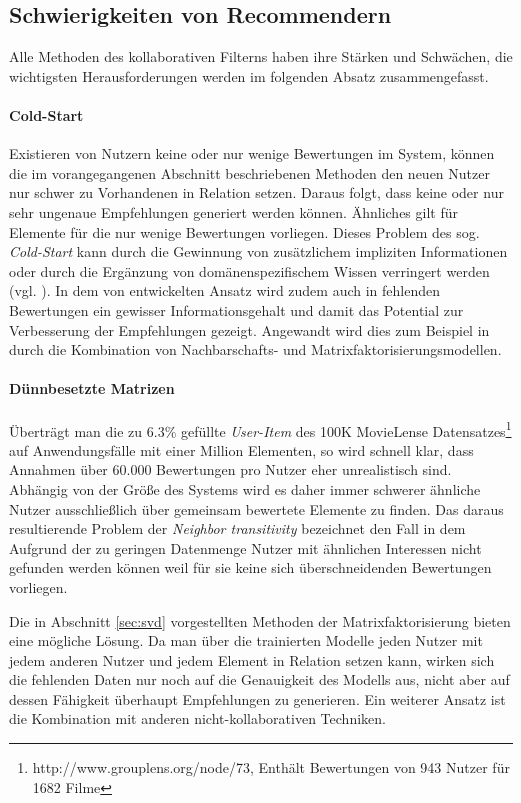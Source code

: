\subsection{Schwierigkeiten von Recommendern}\label{sec:filterissues}

Alle Methoden des kollaborativen Filterns haben ihre Stärken und Schwächen, die wichtigsten Herausforderungen werden im folgenden Absatz zusammengefasst.

\paragraph{Cold-Start} Existieren von Nutzern keine oder nur wenige Bewertungen im System, können die im vorangegangenen Abschnitt beschriebenen Methoden den neuen Nutzer nur schwer zu Vorhandenen in Relation setzen. Daraus folgt, dass keine oder nur sehr ungenaue Empfehlungen generiert werden können. Ähnliches gilt für Elemente für die nur wenige Bewertungen vorliegen. Dieses Problem des sog. \textit{Cold-Start} kann durch die Gewinnung von zusätzlichem impliziten Informationen oder durch die Ergänzung von domänenspezifischem Wissen verringert werden (vgl. \citep{claypool99}).  In dem von \citep{Steck:2010:TTR:1835804.1835895} entwickelten Ansatz wird zudem auch in fehlenden Bewertungen ein gewisser Informationsgehalt und damit das Potential zur Verbesserung der Empfehlungen gezeigt. Angewandt wird dies zum Beispiel in \citep{Toscher:2008:INA:1722149.1722153} durch die Kombination von Nachbarschafts- und Matrixfaktorisierungsmodellen.

\paragraph{Dünnbesetzte Matrizen} Überträgt man die zu 6.3\% gefüllte \textit{User-Item} des 100K MovieLense Datensatzes\footnote{http://www.grouplens.org/node/73, Enthält Bewertungen von 943 Nutzer für 1682 Filme} auf Anwendungsfälle mit einer Million Elementen, so wird schnell klar, dass Annahmen über 60.000 Bewertungen pro Nutzer eher unrealistisch sind. Abhängig von der Größe des Systems wird es daher immer schwerer ähnliche Nutzer ausschließlich über gemeinsam bewertete Elemente zu finden. Das daraus resultierende Problem der \textit{Neighbor transitivity} bezeichnet den Fall in dem Aufgrund der zu geringen Datenmenge Nutzer mit ähnlichen Interessen nicht gefunden werden können weil für sie keine sich überschneidenden Bewertungen vorliegen.

Die in Abschnitt \ref{sec:svd} vorgestellten Methoden der Matrixfaktorisierung bieten eine mögliche Lösung. Da man über die trainierten Modelle jeden Nutzer mit jedem anderen Nutzer und jedem Element in Relation setzen kann, wirken sich die fehlenden Daten nur noch auf die Genauigkeit des Modells aus, nicht aber auf dessen Fähigkeit überhaupt Empfehlungen zu generieren. Ein weiterer Ansatz ist die Kombination mit anderen nicht-kollaborativen Techniken. \citep{Koren:2009:MFT:1608565.1608614,claypool99}

